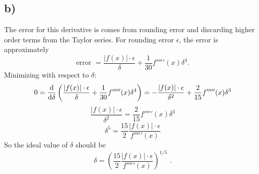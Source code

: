 \documentclass{article}
\newcommand{\<}[1]{\left\langle #1 \right\rangle }
\begin{document}
\subsection{b)}
The error for this derivative is comes from rounding error and discarding higher order terms from the Taylor series. For rounding error $\epsilon$, the error is approximately 
\[\text{error } = \frac{|f(x)|\cdot\epsilon}{\delta} + \frac{1}{30}f'''''(x)\delta^4 \text{.}\]
Minimizing with respect to $\delta$:
\[0 = \dv{}{\delta}\left( \frac{|f(x)|\cdot\epsilon}{\delta} + \frac{1}{30}f'''''(x)\delta^4 \right) = -\frac{|f(x)|\cdot \epsilon}{\delta^2} + \frac{2}{15}f'''''(x)\delta^3\]
\[\frac{|f(x)|\cdot \epsilon}{\delta^2} = \frac{2}{15}f'''''(x)\delta^3\]
\[\delta^5 = \frac{15}{2}\frac{|f(x)|\cdot \epsilon}{f'''''(x)}\]
So the ideal value of $\delta$ should be 
\[\boxed{ \delta = \left(\frac{15}{2}\frac{|f(x)|\cdot \epsilon}{f'''''(x)}\right)^{1/5} }\text{ .}\]

\section{}
\end{document}
